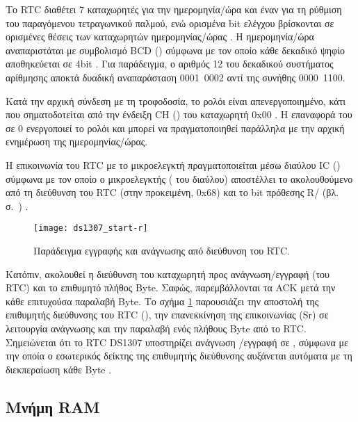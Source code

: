Το RTC διαθέτει 7 καταχωρητές για την ημερομηνία\slash{}ώρα και έναν για τη
ρύθμιση του παραγόμενου τετραγωνικού παλμού, ενώ ορισμένα bit ελέγχου βρίσκονται
σε ορισμένες θέσεις των καταχωρητών ημερομηνίας\slash{}ώρας
\parencite[8]{ds1307}. Η ημερομηνία\slash{}ώρα
αναπαριστάται με συμβολισμό BCD () σύμφωνα με
τον οποίο κάθε δεκαδικό ψηφίο αποθηκεύεται σε 4bit \parencite[8]{ds1307}.
Για παράδειγμα, ο αριθμός 12 του δεκαδικού συστήματος αρίθμησης αποκτά δυαδική
αναπαράσταση 0001~0002 αντί της συνήθης 0000~1100.

Κατά την αρχική σύνδεση με τη τροφοδοσία, το ρολόι είναι απενεργοποιημένο, κάτι
που σηματοδοτείται από την ένδειξη CH () του καταχωρητή 0x00
\parencite[8]{ds1307}. Η επαναφορά του σε 0 ενεργοποιεί το ρολόι και μπορεί να
πραγματοποιηθεί παράλληλα με την αρχική ενημέρωση της ημερομηνίας\slash{}ώρας.

Η επικοινωνία του RTC με το μικροελεγκτή πραγματοποιείται μέσω διαύλου
IC () σύμφωνα με τον οποίο ο μικροελεγκτής
( του διαύλου) αποστέλλει το  ακολουθούμενο από τη
διεύθυνση του RTC (στην προκειμένη, 0x68) και το bit πρόθεσης R\slash{}
(βλ.  σ.~\pageref{subsec:i2c}) \parencite[1,10]{ds1307}.

\begin{figure}
    \caption{Παράδειγμα εγγραφής και ανάγνωσης από διεύθυνση του RTC.
    \label{fig:rtc:start-r}}
    \begin{center}
    \texttt{[image: ds1307\_start-r]}
    \end{center}
\end{figure}

Κατόπιν, ακολουθεί η διεύθυνση του καταχωρητή προς ανάγνωση\slash{}εγγραφή (του
RTC) και το επιθυμητό πλήθος Byte. Σαφώς, παρεμβάλλονται τα  ACK μετά
την κάθε επιτυχούσα παραλαβή Byte. Το σχήμα \ref{fig:rtc:start-r} παρουσιάζει
την αποστολή της επιθυμητής διεύθυνσης του RTC (), την
επανεκκίνηση της επικοινωνίας (Sr) σε λειτουργία ανάγνωσης και την παραλαβή ενός
πλήθους Byte από το RTC. Σημειώνεται ότι το RTC DS1307 υποστηρίζει ανάγνωση%
\slash{}εγγραφή σε , σύμφωνα με την οποία ο εσωτερικός δείκτης
της επιθυμητής διεύθυνσης αυξάνεται αυτόματα με τη διεκπεραίωση κάθε Byte
\parencite[12]{ds1307}.


\subsection{Μνήμη RAM}
\label{subsec:rtc:user-ram}

